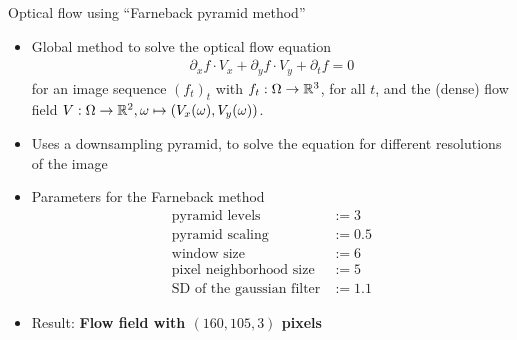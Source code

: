 \begin{frame}{Optical flow using \enquote{Farneback pyramid method}\cite{Farneback2003}}

\begin{itemize}
\item Global method to solve the optical flow equation
\begin{align*}
\partial_x f \cdot V_x + \partial_y f \cdot  V_y + \partial_t f  = 0
\end{align*}
for an image sequence $(f_t)_t$ with $f_t : \Omega \to {\mathbb{R}}^3$, for all $t$, and the (dense) flow field $V : \Omega \to {\mathbb{R}}^2, \omega \mapsto (V_x(\omega), V_y(\omega))$.
\item Uses a downsampling pyramid, to solve the equation for different resolutions of the image
\item Parameters for the Farneback method
\begin{align*}
\text{pyramid levels} &:= 3\\
\text{pyramid scaling} &:= 0.5\\
\text{window size} &:= 6\\
\text{pixel neighborhood size} &:= 5\\
\text{SD of the gaussian filter} &:= 1.1
\end{align*}
\item Result: \textbf{Flow field with $(160,105,3)$ pixels}
\end{itemize}
\end{frame}

